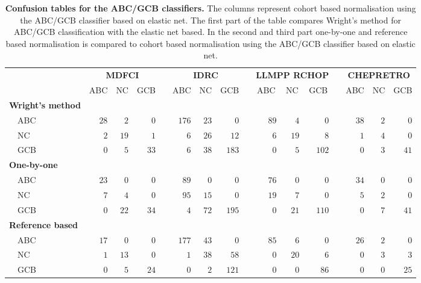 \documentclass[10pt]{bmc_article}
\newenvironment{bmcformat}{\fussy\setboolean{publ}{true}}{\fussy}
\begin{document}
\begin{bmcformat}
\begin{table}[!tbp]
\small
\caption{\textbf{Confusion tables for the ABC/GCB classifiers.} The columns represent cohort based normalisation using the ABC/GCB classifier based on elastic net. The first part of the table compares Wright's method for ABC/GCB classification with the elastic net based. In the second and third part one-by-one and reference based normalisation is compared to cohort based normalisation using the ABC/GCB classifier based on elastic net.\label{tab:confusionABCGCBHEMA}}
\begin{center}
\begin{tabular}{lrrrcrrrcrrrcrrr}
\toprule
\multicolumn{1}{l}{\bfseries  }&\multicolumn{3}{c}{\bfseries MDFCI}&\multicolumn{1}{c}{\bfseries }&\multicolumn{3}{c}{\bfseries IDRC}&\multicolumn{1}{c}{\bfseries }&\multicolumn{3}{c}{\bfseries LLMPP RCHOP}&\multicolumn{1}{c}{\bfseries }&\multicolumn{3}{c}{\bfseries CHEPRETRO}\tabularnewline
\cline{2-4} \cline{6-8} \cline{10-12} \cline{14-16}
\multicolumn{1}{l}{}&\multicolumn{1}{c}{ABC}&\multicolumn{1}{c}{NC}&\multicolumn{1}{c}{GCB}&\multicolumn{1}{c}{}&\multicolumn{1}{c}{ABC}&\multicolumn{1}{c}{NC}&\multicolumn{1}{c}{GCB}&\multicolumn{1}{c}{}&\multicolumn{1}{c}{ABC}&\multicolumn{1}{c}{NC}&\multicolumn{1}{c}{GCB}&\multicolumn{1}{c}{}&\multicolumn{1}{c}{ABC}&\multicolumn{1}{c}{NC}&\multicolumn{1}{c}{GCB}\tabularnewline
\hline
{\bfseries Wright's method}&&&&&&&&&&&&&&&\tabularnewline
~~ABC&$28$&$ 2$&$ 0$&&$176$&$23$&$  0$&&$89$&$ 4$&$  0$&&$38$&$2$&$ 0$\tabularnewline
~~NC&$ 2$&$19$&$ 1$&&$  6$&$26$&$ 12$&&$ 6$&$19$&$  8$&&$ 1$&$4$&$ 0$\tabularnewline
~~GCB&$ 0$&$ 5$&$33$&&$  6$&$38$&$183$&&$ 0$&$ 5$&$102$&&$ 0$&$3$&$41$\tabularnewline
\hline
{\bfseries One-by-one}&&&&&&&&&&&&&&&\tabularnewline
~~ABC&$23$&$ 0$&$ 0$&&$ 89$&$ 0$&$  0$&&$76$&$ 0$&$  0$&&$34$&$0$&$ 0$\tabularnewline
~~NC&$ 7$&$ 4$&$ 0$&&$ 95$&$15$&$  0$&&$19$&$ 7$&$  0$&&$ 5$&$2$&$ 0$\tabularnewline
~~GCB&$ 0$&$22$&$34$&&$  4$&$72$&$195$&&$ 0$&$21$&$110$&&$ 0$&$7$&$41$\tabularnewline
\hline
{\bfseries Reference based}&&&&&&&&&&&&&&&\tabularnewline
~~ABC&$17$&$ 0$&$ 0$&&$177$&$43$&$  0$&&$85$&$ 6$&$  0$&&$26$&$2$&$ 0$\tabularnewline
~~NC&$ 1$&$13$&$ 0$&&$  1$&$38$&$ 58$&&$ 0$&$20$&$  6$&&$ 0$&$3$&$ 3$\tabularnewline
~~GCB&$ 0$&$ 5$&$24$&&$  0$&$ 2$&$121$&&$ 0$&$ 0$&$ 86$&&$ 0$&$0$&$25$\tabularnewline
\hline
\end{tabular}
\end{center}
\end{table}



\end{bmcformat}
\end{document}
